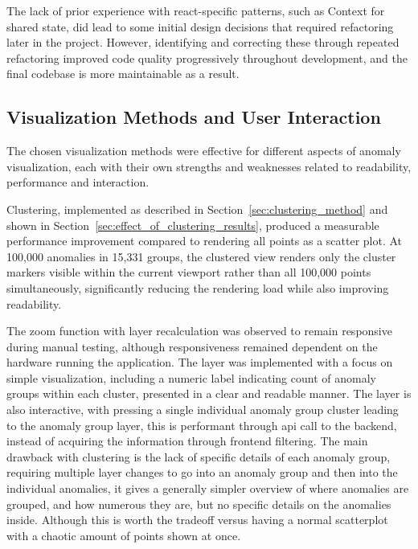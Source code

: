 The lack of prior experience with \gls{react}-specific patterns, such as Context for shared state, did lead to some initial design decisions that required refactoring later in the project. However, identifying and correcting these through repeated refactoring improved code quality progressively throughout development, and the final codebase is more maintainable as a result.


\subsection{Visualization Methods and User Interaction}

The chosen visualization methods were effective for different aspects of anomaly visualization, each with their own strengths and weaknesses related to readability, performance and interaction. 

Clustering, implemented as described in Section~\ref{sec:clustering_method} and shown in Section~\ref{sec:effect_of_clustering_results}, produced a measurable performance improvement compared to rendering all points as a scatter plot. At 100,000 anomalies in 15,331 groups, the clustered view renders only the cluster markers visible within the current viewport rather than all 100,000 points simultaneously, significantly reducing the rendering load while also improving readability. 

The zoom function with layer recalculation was observed to remain responsive during manual testing, although responsiveness remained dependent on the hardware running the application. The layer was implemented with a focus on simple visualization, including a numeric label indicating count of anomaly groups within each cluster, presented in a clear and readable manner. The layer is also interactive, with pressing 
a single individual anomaly group cluster leading to the anomaly group layer, this is performant through \acrshort{api} call to the backend, instead of acquiring the information through frontend filtering. The main drawback with clustering is the lack of specific details of each anomaly group, requiring multiple layer changes to go into an anomaly group and then into the individual anomalies, it gives a generally simpler overview of where anomalies are grouped, and how numerous they are, but no specific details on the anomalies inside. Although this is worth the tradeoff versus having a normal scatterplot with a chaotic amount of points shown at once. 

